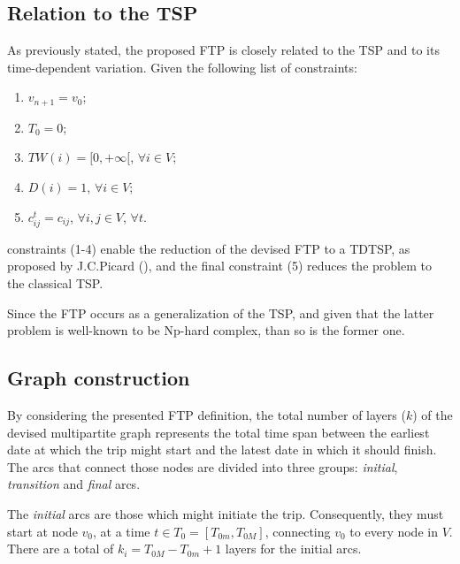 \subsection{Relation to the TSP}

As previously stated, the proposed FTP is closely related to the TSP and to its
time-dependent variation. Given the following list of constraints:
\begin{enumerate}
      \item $v_{n+1} = v_0$;
      \item $T_0 = 0$;
      \item $TW(i) = [0, +\infty[$, $\forall i \in V$;
      \item $D(i) = 1$, $\forall i \in V$;
    \item $c_{ij}^{t} = c_{ij}$, $\forall i, j \in V$, $\forall t$.
\end{enumerate}
constraints (1-4) enable the reduction of the devised FTP to a TDTSP, as
proposed by J.C.Picard (\cite{tdtsp_picard}), and the final constraint (5)
reduces the problem to the classical TSP.

Since the FTP occurs as a generalization of the TSP, and given that the latter
problem is well-known to be Np-hard complex, than so is the former one.



\subsection{Graph construction}
\label{sec:graph}

By considering the presented FTP definition, the total number of layers ($k$) of
the devised multipartite graph represents the total time span between the
earliest date at which the trip might start and the latest date in which it
should finish. The arcs that connect those nodes are divided into three groups:
\textit{initial}, \textit{transition} and \textit{final} arcs.

The \textit{initial} arcs are those which might initiate the trip. Consequently,
they must start at node $v_0$, at a time $t \in T_0 = [T_{0m}, T_{0M}]$,
connecting $v_0$ to every node in $V$. There are a total of $k_i = T_{0M} -
T_{0m} + 1$ layers for the initial arcs.

